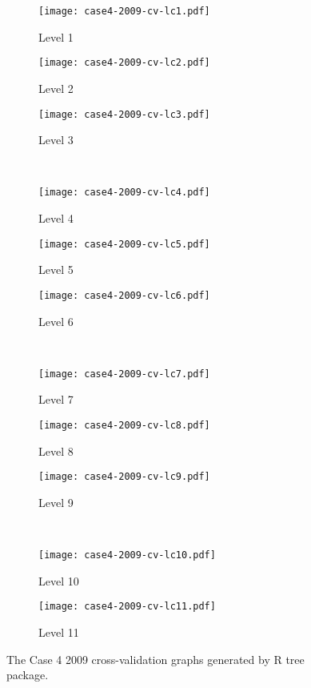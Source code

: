 \begin{appendices}
\begin{figure}[!ht] \centering
	\captionsetup[subfigure]{width=2.0in}
	\begin{subfigure}[t]{0.32\textwidth}
		\texttt{[image: case4-2009-cv-lc1.pdf]}
		\caption{Level 1}
	\end{subfigure}
	\begin{subfigure}[t]{0.32\textwidth}
		\texttt{[image: case4-2009-cv-lc2.pdf]}
		\caption{Level 2}
	\end{subfigure}
	\begin{subfigure}[t]{0.32\textwidth}
		\texttt{[image: case4-2009-cv-lc3.pdf]}
		\caption{Level 3}
	\end{subfigure}\\
	\vspace{5pt}
	\begin{subfigure}[t]{0.32\textwidth}
		\texttt{[image: case4-2009-cv-lc4.pdf]}
		\caption{Level 4}
	\end{subfigure}
	\begin{subfigure}[t]{0.32\textwidth}
		\texttt{[image: case4-2009-cv-lc5.pdf]}
		\caption{Level 5}
	\end{subfigure}
	\begin{subfigure}[t]{0.32\textwidth}
		\texttt{[image: case4-2009-cv-lc6.pdf]}
		\caption{Level 6}
	\end{subfigure}\\
	\vspace{5pt}	
	\begin{subfigure}[t]{0.32\textwidth}
		\texttt{[image: case4-2009-cv-lc7.pdf]}
		\caption{Level 7}
	\end{subfigure}
	\begin{subfigure}[t]{0.32\textwidth}
		\texttt{[image: case4-2009-cv-lc8.pdf]}
		\caption{Level 8}
	\end{subfigure}
	\begin{subfigure}[t]{0.32\textwidth}
		\texttt{[image: case4-2009-cv-lc9.pdf]}
		\caption{Level 9}
	\end{subfigure}\\
	\vspace{5pt}
	\begin{subfigure}[t]{0.32\textwidth}
		\texttt{[image: case4-2009-cv-lc10.pdf]}
		\caption{Level 10}
	\end{subfigure}
	\begin{subfigure}[t]{0.32\textwidth}
		\texttt{[image: case4-2009-cv-lc11.pdf]}
		\caption{Level 11}
	\end{subfigure}
	\vspace{5pt}
	\caption[The Case 4 2009 cross-validation graphs generated by R tree package.]{The Case 4 2009 cross-validation graphs generated by R tree package.}
	\label{fig: appendix-fig.c30.cv}
\end{figure}


\end{appendices}
